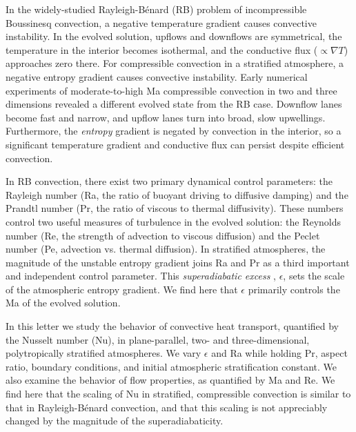 \documentclass[aps, prl, twocolumn, nofootinbib, groupedaddress, amsfonts, amssymb, amsmath]{revtex4-1}
\newcommand{\grad}{\ensuremath{\nabla}}
\newcommand{\RB}{Rayleigh-B\'{e}nard }
\begin{document}
In the widely-studied \RB (RB) problem of incompressible Boussinesq convection, 
a negative temperature gradient causes convective instability.
In the evolved solution, upflows and downflows are symmetrical, the
temperature in the interior becomes isothermal, and
the conductive flux ($\propto \grad T$) approaches 
zero there. 
For compressible convection in a stratified atmosphere, a
negative entropy gradient causes convective instability.
Early numerical experiments of moderate-to-high Ma compressible convection
in two \cite{graham1975, chan&all1982,
hurlburt&all1984, cattaneo&all1990} and three 
\cite{cattaneo&all1991, brandenburg&all2005, brummell&all1996} dimensions
revealed a different evolved state from the RB case.
Downflow lanes
become fast and narrow, and upflow lanes turn into broad, slow upwellings.
Furthermore, the \emph{entropy} gradient is negated by convection in the interior, so
a significant temperature gradient and conductive flux can persist despite
efficient convection.

In RB convection, there exist two primary dynamical control parameters: 
the Rayleigh number (Ra, the ratio of
buoyant driving to diffusive damping) and the Prandtl number 
(Pr, the ratio of viscous to thermal
diffusivity). These numbers control two useful
measures of turbulence in the evolved solution:
the Reynolds
number (Re, the strength of advection to viscous diffusion)
and the Peclet number (Pe, advection vs. thermal diffusion).  
In stratified atmospheres, the magnitude of the unstable entropy gradient
joins Ra and Pr as a third important and independent control parameter.  This 
\emph{superadiabatic excess} \cite{graham1975}, $\epsilon$,
sets the scale of the atmospheric entropy gradient.
We find here that $\epsilon$ primarily controls the Ma of the evolved solution.

In this letter we study the behavior of convective heat transport, 
quantified by the Nusselt number (Nu), in plane-parallel, 
two- and three-dimensional, polytropically stratified atmospheres.  
We vary $\epsilon$ and Ra while holding Pr, aspect ratio, boundary conditions,
and initial atmospheric stratification
constant.  We also examine the behavior of flow properties, as quantified by Ma and Re.
We find here that the scaling of Nu in stratified, compressible convection 
is similar to that in \RB convection,
and that this scaling is not appreciably changed by the magnitude of the superadiabaticity.
\end{document}
